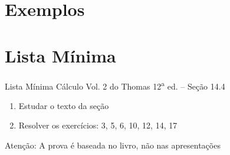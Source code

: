 


\section{Exemplos}






\section{Lista Mínima}

\begin{frame}{Lista Mínima}
  Cálculo Vol. 2 do Thomas 12\textsuperscript{a} ed. -- Seção 14.4
  \begin{enumerate}
    \item Estudar o texto da seção
    \item Resolver os exercícios: 3, 5, 6, 10, 12, 14, 17
  \end{enumerate}

  \vfill
  Atenção: A prova é baseada no livro, não nas apresentações
\end{frame}


